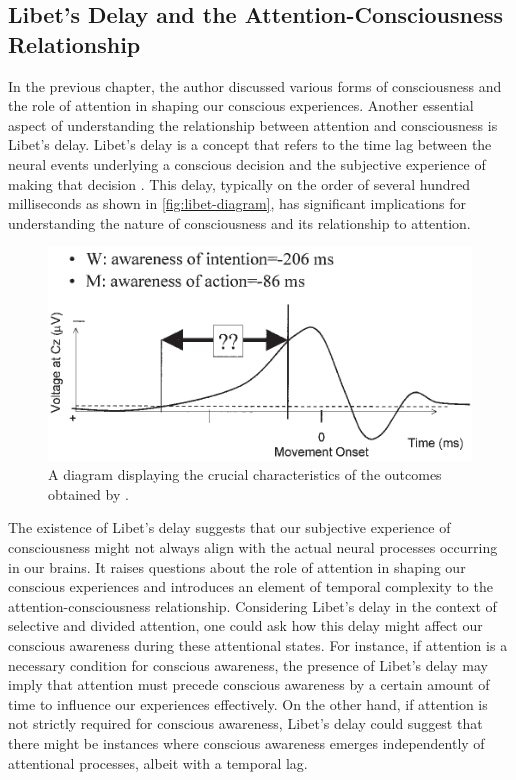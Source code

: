 \documentclass[10pt]{article}
\begin{document}
\begin{sloppypar}
  \subsection{Libet’s Delay and the Attention-Consciousness Relationship}
  \label{sec:libet}

  In the previous chapter, the author discussed various forms of consciousness and the role of attention in shaping our conscious experiences. Another essential aspect of understanding the relationship between attention and consciousness is Libet’s delay. Libet’s delay is a concept that refers to the time lag between the neural events underlying a conscious decision and the subjective experience of making that decision \citep{libet_time_1983}. This delay, typically on the order of several hundred milliseconds as shown in \autoref{fig:libet-diagram}, has significant implications for understanding the nature of consciousness and its relationship to attention.

  \begin{figure}[ht]
    \centering
    \includegraphics[width=\textwidth]{figures/libet.png}
    \caption[A diagram displaying the crucial characteristics of the outcomes obtained by Libet et al.]{A diagram displaying the crucial characteristics of the outcomes obtained by \cite{libet_time_1983} \citep{haggard_conscious_2001}.}
    \label{fig:libet-diagram}
  \end{figure}

  The existence of Libet’s delay suggests that our subjective experience of consciousness might not always align with the actual neural processes occurring in our brains. It raises questions about the role of attention in shaping our conscious experiences and introduces an element of temporal complexity to the attention-consciousness relationship. Considering Libet’s delay in the context of selective and divided attention, one could ask how this delay might affect our conscious awareness during these attentional states. For instance, if attention is a necessary condition for conscious awareness, the presence of Libet’s delay may imply that attention must precede conscious awareness by a certain amount of time to influence our experiences effectively. On the other hand, if attention is not strictly required for conscious awareness, Libet’s delay could suggest that there might be instances where conscious awareness emerges independently of attentional processes, albeit with a temporal lag.


\end{sloppypar}
\end{document}
